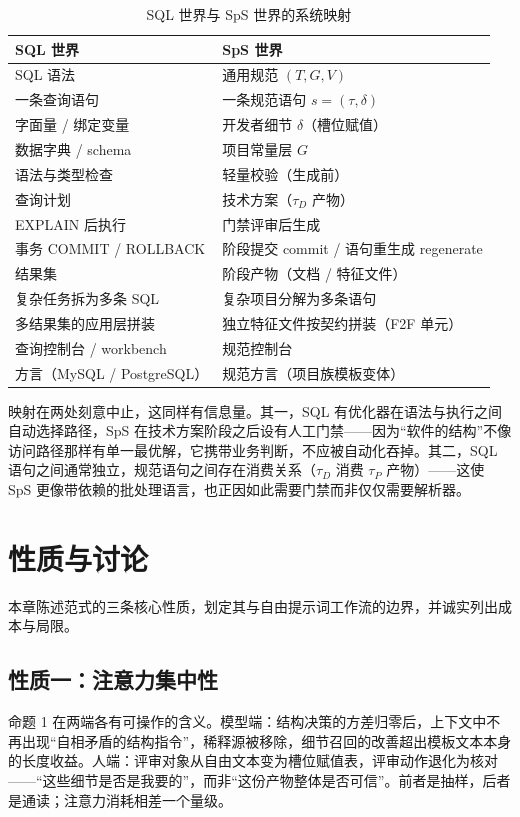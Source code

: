 \documentclass[11pt,a4paper]{ctexart}
\begin{document}
\begin{table}[htbp]
\centering
\caption{SQL 世界与 SpS 世界的系统映射}
\label{tab:mapping}
\small
\begin{tabular}{|l|l|}
\hline
\textbf{SQL 世界} & \textbf{SpS 世界} \\
\hline
SQL 语法 & 通用规范 $(T,G,V)$ \\
\hline
一条查询语句 & 一条规范语句 $s=(\tau,\delta)$ \\
\hline
字面量 / 绑定变量 & 开发者细节 $\delta$（槽位赋值） \\
\hline
数据字典 / schema & 项目常量层 $G$ \\
\hline
语法与类型检查 & 轻量校验（生成前） \\
\hline
查询计划 & 技术方案（$\tau_D$ 产物） \\
\hline
EXPLAIN 后执行 & 门禁评审后生成 \\
\hline
事务 COMMIT / ROLLBACK & 阶段提交 commit / 语句重生成 regenerate \\
\hline
结果集 & 阶段产物（文档 / 特征文件） \\
\hline
复杂任务拆为多条 SQL & 复杂项目分解为多条语句 \\
\hline
多结果集的应用层拼装 & 独立特征文件按契约拼装（F2F 单元） \\
\hline
查询控制台 / workbench & 规范控制台 \\
\hline
方言（MySQL / PostgreSQL） & 规范方言（项目族模板变体） \\
\hline
\end{tabular}
\end{table}

映射在两处刻意中止，这同样有信息量。其一，SQL 有优化器在语法与执行之间自动选择路径，SpS 在技术方案阶段之后设有人工门禁——因为“软件的结构”不像访问路径那样有单一最优解，它携带业务判断，不应被自动化吞掉。其二，SQL 语句之间通常独立，规范语句之间存在消费关系（$\tau_D$ 消费 $\tau_P$ 产物）——这使 SpS 更像带依赖的批处理语言，也正因如此需要门禁而非仅仅需要解析器。

\section{性质与讨论}
本章陈述范式的三条核心性质，划定其与自由提示词工作流的边界，并诚实列出成本与局限。

\subsection{性质一：注意力集中性}
命题 1 在两端各有可操作的含义。模型端：结构决策的方差归零后，上下文中不再出现“自相矛盾的结构指令”，稀释源被移除，细节召回的改善超出模板文本本身的长度收益\cite{ref11}。人端：评审对象从自由文本变为槽位赋值表，评审动作退化为核对——“这些细节是否是我要的”，而非“这份产物整体是否可信”。前者是抽样，后者是通读；注意力消耗相差一个量级。
\end{document}
